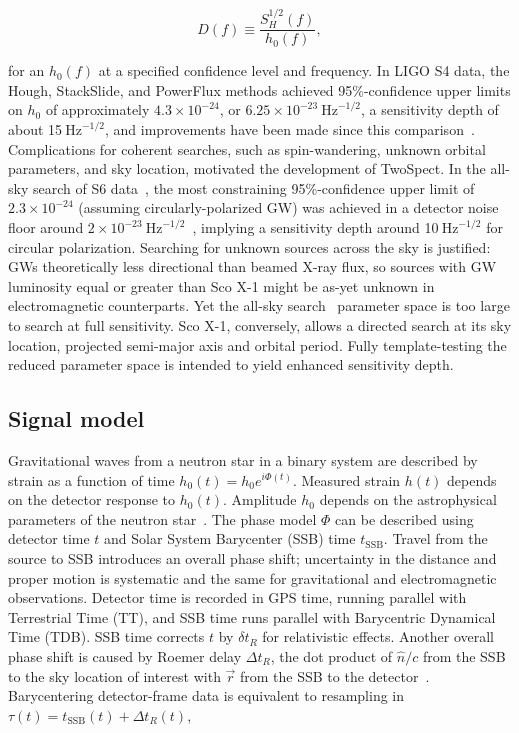 \begin{equation}
D(f) \equiv \frac{S_H^{1/2}(f)}{h_0(f)},
\end{equation}

\noindent for an $h_0(f)$ at a specified confidence level and frequency.
In LIGO S4 data, the Hough, StackSlide, and PowerFlux methods achieved 95\%-confidence upper limits on $h_0$ of approximately $4.3\times 10^{-24}$,
or $6.25\times 10^{-23} \mathrm{~Hz}^{-1/2}$,
a sensitivity depth of about 15$\mathrm{~Hz}^{-1/2}$,
and improvements have been made since this comparison~\cite{LSCPulsarS4}.
Complications for coherent searches, such as spin-wandering, unknown orbital parameters, and sky location, motivated the development of TwoSpect.
In the all-sky search of S6 data~\cite{GoetzTwoSpectResults2014}, the most constraining 95\%-confidence upper limit of $2.3\times10^{-24}$ (assuming circularly-polarized GW) was achieved in a detector noise floor around $2\times 10^{-23} \mathrm{~Hz}^{-1/2}$~\cite{Fricke2009}, implying a sensitivity depth around 10$\mathrm{~Hz}^{-1/2}$ for circular polarization.
Searching for unknown sources across the sky is justified: GWs theoretically less directional than beamed X-ray flux, so sources with GW luminosity equal or greater than Sco X-1 might be as-yet unknown in electromagnetic counterparts.
Yet the all-sky search~\cite{GoetzTwoSpectMethods2011} parameter space is too large to search at full sensitivity.
Sco X-1, conversely, allows a directed search at its sky location, projected semi-major axis and orbital period.
Fully template-testing the reduced parameter space is intended to yield enhanced sensitivity depth.


    \subsection{Signal model}
    \label{signal-model-appendix}


Gravitational waves from a neutron star in a binary system are described by strain as a function of time $h_0(t) = h_0 e^{i \Phi(t)}$. 
Measured strain $h(t)$ depends on the detector response to $h_0(t)$.
Amplitude $h_0$ depends on the astrophysical parameters of the neutron star~\cite{Jaranowski1998}.
The phase model $\Phi$ can be described using detector time $t$ and Solar System Barycenter (SSB) time $t_\mathrm{SSB}$.
Travel from the source to SSB introduces an overall phase shift; uncertainty in the distance and proper motion is systematic and the same for gravitational and electromagnetic observations.
Detector time is recorded in GPS time, running parallel with Terrestrial Time (TT), and SSB time runs parallel with Barycentric Dynamical Time (TDB). 
SSB time corrects $t$ by $\delta t_R$ for relativistic effects.
Another overall phase shift is caused by  Roemer delay $\Delta t_R$, the dot product of $\hat{n}/c$ from the SSB to the sky location of interest with $\vec{r}$ from the SSB to the detector~\cite{Jaranowski1998,GoetzTwoSpectMethods2011,TwoSpectCoherentGoetz2015}.
Barycentering detector-frame data is equivalent to resampling in $\tau(t) = t_\mathrm{SSB}(t) + \Delta t_R(t)$, 

